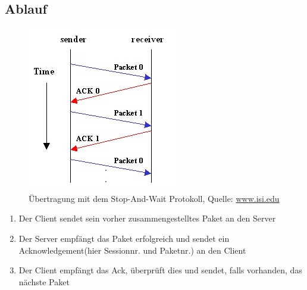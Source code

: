 \documentclass[a4paper, 12pt]{scrartcl}
\begin{document}
\subsection{Ablauf}
\begin{figure}[h] 
  \centering
     \includegraphics[scale=1.2]{e-stop.jpg}
  \caption{Übertragung mit dem Stop-And-Wait Protokoll, Quelle: \href{http://www.isi.edu/nsnam/DIRECTED_RESEARCH/DR_HYUNAH/D-Research/e-stop.gif}{www.isi.edu}}

  \label{stop_n_wait}
\end{figure}
\begin{enumerate}
	\item 	Der Client sendet sein vorher zusammengestelltes Paket an den Server
	\item 	Der Server empfängt das Paket erfolgreich und sendet ein Acknowledgement(hier Sessionnr. und Paketnr.) an den Client 
	\item 	Der Client empfängt das Ack, überprüft dies und sendet, falls vorhanden, das nächste Paket
\end{enumerate}
\end{document}
